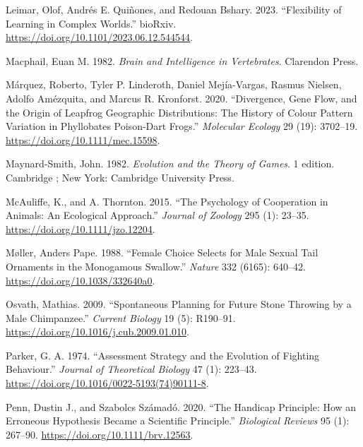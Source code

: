 \documentclass[
  12pt,
]{article}
\newlength{\cslhangindent}
\newlength{\cslentryspacingunit} %
\newenvironment{CSLReferences}[2] %
 {%
  \setlength{\parindent}{0pt}
  \ifodd #1
  \let\oldpar\par
  \def\par{\hangindent=\cslhangindent\oldpar}
  \fi
  \setlength{\parskip}{#2\cslentryspacingunit}
 }%
 {}
\begin{document}
\begin{CSLReferences}{1}{0}
\leavevmode{}%
Leimar, Olof, Andrés E. Quiñones, and Redouan Bshary. 2023.
{``Flexibility of Learning in Complex Worlds.''} bioRxiv.
\url{https://doi.org/10.1101/2023.06.12.544544}.

\leavevmode{}%
Macphail, Euan M. 1982. \emph{Brain and {Intelligence} in
{Vertebrates}}. Clarendon Press.

\leavevmode{}%
Márquez, Roberto, Tyler P. Linderoth, Daniel Mejía-Vargas, Rasmus
Nielsen, Adolfo Amézquita, and Marcus R. Kronforst. 2020. {``Divergence,
Gene Flow, and the Origin of Leapfrog Geographic Distributions: {The}
History of Colour Pattern Variation in {Phyllobates} Poison-Dart
Frogs.''} \emph{Molecular Ecology} 29 (19): 3702--19.
\url{https://doi.org/10.1111/mec.15598}.

\leavevmode{}%
Maynard-Smith, John. 1982. \emph{Evolution and the {Theory} of {Games}}.
1 edition. Cambridge ; New York: Cambridge University Press.

\leavevmode{}%
McAuliffe, K., and A. Thornton. 2015. {``The Psychology of Cooperation
in Animals: An Ecological Approach.''} \emph{Journal of Zoology} 295
(1): 23--35. \url{https://doi.org/10.1111/jzo.12204}.

\leavevmode{}%
Møller, Anders Pape. 1988. {``Female Choice Selects for Male Sexual Tail
Ornaments in the Monogamous Swallow.''} \emph{Nature} 332 (6165):
640--42. \url{https://doi.org/10.1038/332640a0}.

\leavevmode{}%
Osvath, Mathias. 2009. {``Spontaneous Planning for Future Stone Throwing
by a Male Chimpanzee.''} \emph{Current Biology} 19 (5): R190--91.
\url{https://doi.org/10.1016/j.cub.2009.01.010}.

\leavevmode{}%
Parker, G. A. 1974. {``Assessment Strategy and the Evolution of Fighting
Behaviour.''} \emph{Journal of Theoretical Biology} 47 (1): 223--43.
\url{https://doi.org/10.1016/0022-5193(74)90111-8}.

\leavevmode{}%
Penn, Dustin J., and Szabolcs Számadó. 2020. {``The {Handicap}
{Principle}: How an Erroneous Hypothesis Became a Scientific
Principle.''} \emph{Biological Reviews} 95 (1): 267--90.
\url{https://doi.org/10.1111/brv.12563}.


\end{CSLReferences}
\end{document}
